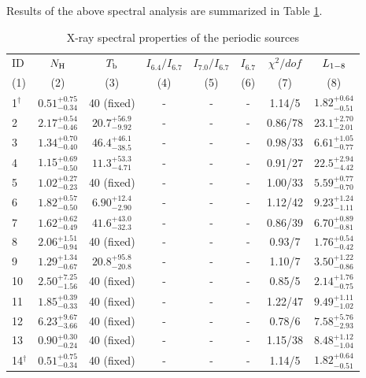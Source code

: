 \documentclass[fleqn,usenatbib]{mnras}
\begin{document}
Results of the above spectral analysis are summarized in Table \ref{tab:spec}.
\begin{table}
\centering
\begin{threeparttable}
\caption{X-ray spectral properties of the periodic sources \label{tab:spec}}
\begin{spacing}{1.19}

\begin{tabular}{lccccccc}
\hline
\hline
ID & $N_{\rm H}$ & $T_{\rm b}$ & $I_{6.4}/I_{6.7}$ &
$I_{7.0}/I_{6.7}$ &  $I_{6.7}$ & $\chi^2/dof$ & $L_{\rm 1-8}$ 
\\
(1) & (2) & (3) & (4) & (5) & (6) & (7) & (8)
\\
\hline

1$^\dag$ & $0.51^{+0.75}_{-0.34}$ & 40 (fixed)  &-&-&-& 1.14/5  & $1.82^{+0.64}_{-0.51}$
\\
2 & $2.17^{+0.54}_{-0.46}$ & $20.7^{+56.9}_{-9.92}$ &-&-&-& 0.86/78  & $23.1^{+2.70}_{-2.01}$
\\
3 & $1.34^{+0.70}_{-0.40}$ & $46.4^{+46.1}_{-38.5}$ &-&-&-& 0.98/33  & $6.61^{+1.05}_{-0.77}$
\\
4 & $1.15^{+0.69}_{-0.50}$ & $11.3^{+53.3}_{-4.71}$ &-&-&-& 0.91/27  & $22.5^{+2.94}_{-4.42}$
\\
5 & $1.02^{+0.27}_{-0.23}$ & 40 (fixed) &-&-&-& 1.00/33 &  $5.59^{+0.77}_{-0.70}$
\\
6 & $1.82^{+0.57}_{-0.50}$ & $6.90^{+12.4}_{-2.90}$ 
	&-&-&-& 1.12/42 &  $9.23^{+1.24}_{-1.11}$
\\
7 & $1.62^{+0.62}_{-0.49}$ & $41.6^{+43.0}_{-32.3}$ &-&-&-& 0.86/39 &  $6.70^{+0.89}_{-0.81}$
\\
8 & $2.06^{+1.51}_{-0.94}$ & 40 (fixed) &-&-&-& 0.93/7 &  $1.76^{+0.54}_{-0.42}$
\\
9 & $1.29^{+1.34}_{-0.67}$ & $20.8^{+95.8}_{-20.8}$ &-&-&-& 1.10/7 &  $3.50^{+1.22}_{-0.86}$
\\
10 & $2.50^{+7.25}_{-1.56}$ & 40 (fixed)  &-&-&-& 0.85/5 &  $2.14^{+1.76}_{-0.75}$
\\
11 & $1.85^{+0.39}_{-0.33}$ & 40 (fixed)  &-&-&-& 1.22/47 &  $9.49^{+1.11}_{-1.02}$
\\
12 & $6.23^{+9.67}_{-3.66}$ & 40 (fixed) &-&-&-& 0.78/6 &  $7.58^{+5.76}_{-2.93}$
\\
13 & $0.90^{+0.30}_{-0.24}$ & 40 (fixed) &-&-&-& 1.15/38 &  $8.48^{+1.12}_{-1.04}$
\\
14$^\dag$ & $0.51^{+0.75}_{-0.34}$ & 40 (fixed) &-&-&-&  1.14/5 &  $1.82^{+0.64}_{-0.51}$
\\

\end{tabular}
\end{spacing}
\end{threeparttable}
\end{table}
\end{document}
